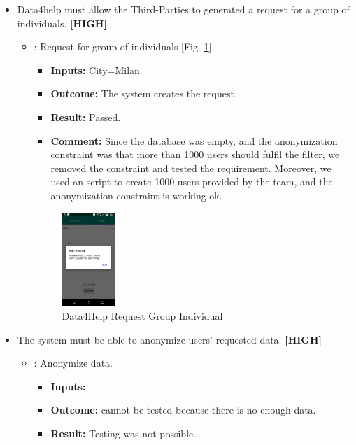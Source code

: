 \documentclass[a4paper, hidelinks, 12pt]{report}
\newcommand\requirement[1]{\item[{[REQ-#1]}] }
\newcommand\test[1]{\item[{[TEST-#1]}] }
\begin{document}
\begin{itemize}
	\requirement{10} Data4help must allow the Third-Parties to generated a request for a group of individuals.  \textbf{[HIGH]}
	
						\begin{itemize}
		\test{9}: Request for group of individuals [Fig. \ref{fig:request_group_individuals}].
			\begin{itemize}
			\item \textbf{Inputs: } City=Milan	
			\item \textbf{Outcome: } The system creates the request.
			\item \textbf{Result: } Passed.
			\item \textbf{Comment: } Since the database was empty, and the anonymization constraint was that more than 1000 users should fulfil the filter, we removed the constraint and tested the requirement. Moreover, we used an script to create 1000 users provided by the team, and the anonymization constraint is working ok.  
			\end{itemize}
			\begin{figure}[H]
					\centering
				\includegraphics[width=0.2\textwidth]{images/request_group_individuals.jpeg}
					\caption[Data4Help Request Group Individual]{Data4Help Request Group Individual}
				\label{fig:request_group_individuals}
			\end{figure}

	\end{itemize}
	
	\requirement{11} The system must be able to anonymize users’ requested data. \textbf{[HIGH]}
	\begin{itemize}
		\test{10}: Anonymize data.
			\begin{itemize}
			\item \textbf{Inputs: } -			
			\item \textbf{Outcome: } cannot be tested because there is no enough data.
			\item \textbf{Result: } Testing was not possible. 
			\end{itemize}	
	\end{itemize}
	

\end{itemize}
\end{document}
